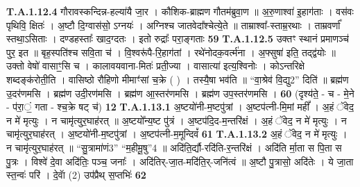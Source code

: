 \documentclass[17pt]{extarticle}
\begin{document}
                  \newline
                                                                  \textbf{ T.A.1.12.4} \newline
                  गौरावस्कन्दिन्न-हल्या॑यै जा॒र । कौशिक-ब्राह्मण गौतम॑ब्रुवा॒ण ॥ अ॒रु॒णाश्वा॑ इ॒हाग॑ताः । वस॑वः पृथिवि॒ क्षितः॑ । अ॒ष्टौ दि॒ग्वास॑सो॒ ऽग्नयः॑ । अग्निश्च जातवेदा᳚श्चेत्ये॒ते ॥ ताम्राश्वा᳚-स्ताम्र॒रथाः । ताम्रवर्णा᳚ स्तथा॒ऽसिताः । दण्डहस्ताः᳚ खाद॒ग्दतः । इतो रुद्राः᳚ परा॒ङ्गताः \textbf{ 59} \newline
                  \newline
                                                                  \textbf{ T.A.1.12.5} \newline
                  उक्तꣳ स्थानं प्रमाणञ्च॑ पुर॒ इत ॥ बृह॒स्पति॑श्च सवि॒ता च॑ । वि॒श्वरू॑पै-रि॒हाग॑तां । रथे॑नोदक॒वर्त्म॑ना । अ॒फ्सुषा॑ इति॒ तद्द्व॑योः ॥  उक्तो वेषो॑ वासाꣳ॒॒सि च । कालावयवाना-मितः॑ प्रती॒ज्या । वासात्या॑ इत्य॒श्विनोः । कोऽन्तरिक्षे शब्दङ्क॑रोती॒ति । वासिष्ठो रौहिणो मीमाꣳ॑सां च॒क्रे ( ) । तस्यै॒षा भव॑ति ॥  “वा॒श्रेव॑ वि॒द्यु{2}” दिति॑ ॥ ब्रह्म॑ण उ॒दर॑णमसि । ब्रह्म॑ण उदी॒रण॑मसि । ब्रह्म॑ण आ॒स्तर॑णमसि । ब्रह्म॑ण उप॒स्तर॑णमसि । \textbf{ 60} \newline
                  \newline
                                                        (दृश्य॑ते॒ - च - मे॒ने - प॑रा॒ं॒ गता - श्च॒क्रे षट् च॑) \textbf{12} \newline \newline
                                \textbf{ T.A.1.13.1} \newline
                  अ॒ष्टयो॑नी-म॒ष्टपु॑त्रां । अ॒ष्टप॑त्नी-मि॒मां महीं᳚ । अ॒हं ॅवेद॒ न मे॑ मृत्युः ।  न चामृ॑त्युर॒घाह॑रत् ॥ अ॒ष्टयो᳚न्य॒ष्ट पु॑त्रं । अ॒ष्टप॑दि॒द-म॒न्तरि॑क्षं । अ॒हं ॅवेद॒ न मे॑ मृत्युः । न चामृ॑त्युर॒घाह॑रत् । अ॒ष्टयो॑नी-म॒ष्टपु॑त्रां । अ॒ष्टप॑त्नी-म॒मून्दिवं᳚ \textbf{ 61} \newline
                  \newline
                                                                  \textbf{ T.A.1.13.2} \newline
                  अ॒हं ॅवेद॒ न मे॑ मृत्युः ।  न चामृ॑त्युर॒घाह॑रत् ॥ “सु॒त्रामा॑णं{3}” “म॒हीमू॒षु”{4} ॥ अदि॑ति॒र्द्यौ-रदि॑ति-र॒न्तरि॑क्षं ।  अदि॑ति र्मा॒ता स पि॒ता स पु॒त्रः । विश्वे॑ दे॒वा अदि॑तिः॒ पञ्च॒ जनाः᳚ । अदि॑तिर्-जा॒त-मदि॑ति॒र्-जनि॑त्वं ॥ अ॒ष्टौ पु॒त्रासो॒ अदि॑तेः । ये जा॒ता स्त॒न्वः॑ परि॑ । दे॒वाॅ (2) उप॑प्रैथ् स॒प्तभिः॑ \textbf{ 62} \newline
                  \newline
\end{document}
